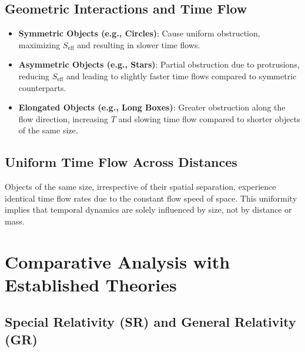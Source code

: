 \documentclass[12pt]{article}
\begin{document}
\subsection{Geometric Interactions and Time Flow}

\begin{itemize}
    \item \textbf{Symmetric Objects (e.g., Circles)}: Cause uniform obstruction, maximizing \( S_{\text{eff}} \) and resulting in slower time flows.
    \item \textbf{Asymmetric Objects (e.g., Stars)}: Partial obstruction due to protrusions, reducing \( S_{\text{eff}} \) and leading to slightly faster time flows compared to symmetric counterparts.
    \item \textbf{Elongated Objects (e.g., Long Boxes)}: Greater obstruction along the flow direction, increasing \( T \) and slowing time flow compared to shorter objects of the same size.
\end{itemize}

\subsection{Uniform Time Flow Across Distances}

Objects of the same size, irrespective of their spatial separation, experience identical time flow rates due to the constant flow speed of space. This uniformity implies that temporal dynamics are solely influenced by size, not by distance or mass.

\section{Comparative Analysis with Established Theories}

\subsection{Special Relativity (SR) and General Relativity (GR)}
\end{document}
